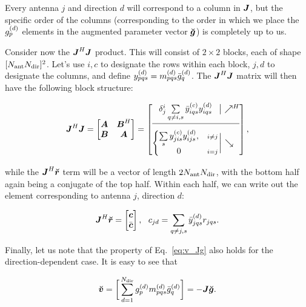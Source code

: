 \documentclass[useAMS,usenatbib]{mn2e}
\newcommand{\mat}[1]{{\bmath{#1}}}
\newcommand{\JJ}{\mat{J}} %
\newcommand{\JHJ}{\JJ^H\JJ} %
\begin{document}
Every antenna $j$ and direction $d$ will correspond to a column in $\JJ$, but the specific order of the columns 
(corresponding to the order in which we place the $g^{(d)}_p$ elements in the augmented parameter vector $\Gg$)
is completely up to us. 

Consider now the $\JHJ$ product. This will consist of $2\times2$ blocks, each of shape 
$[N_\mathrm{ant}N_\mathrm{dir}]^2$. Let's use $i,c$ to designate the rows within each block, $j,d$ to designate the columns, 
and define $y^{(d)}_{pqs}=m^{(d)}_{pqs}\bar{g}^{(d)}_q$. The $\JHJ$ matrix will then have the following block 
structure:

\begin{equation}
\JHJ = \Matrix{cc}{\bmath{A}&\bmath{B}^H\\\bmath{B}&\bmath{A}}
= \JHJblocks{
  \delta^i_j \sum\limits_{q\ne i,s} \yycH_{iqs} \yyd_{iqs} 
}{
  \left \{ 
  \begin{array}{@{}cc@{}}
   \sum\limits_{s} \yyc_{jis} \yyd_{ijs},&{\scriptstyle i\ne j} \\
   0 &{\scriptstyle i=j}
  \end{array} \right . 
},
\label{eq:JHJ:DD:unpol}
\end{equation}

while the $\JJ^H\Rr$ term will be a vector of length $2N_\mathrm{ant}N_\mathrm{dir}$, with the bottom half again being
a conjugate of the top half. Within each half, we can write out the element corresponding to 
antenna $j$, direction $d$: 

\begin{equation}
\label{eq:JHR:DD:unpol}
\JJ^H\Rr = \Matrix{c}{\bmath{c}\\\bar{\bmath{c}}},~~c_{jd} = \sum\limits_{q\ne j,s} 
\yydH_{jqs} r_{jqs}.
\end{equation}

Finally, let us note that the property of Eq.~\ref{eq:v_Jg} also holds for the direction-dependent case. It is easy to see that

\begin{equation}
\label{eq:v_Jg:dd}
\Vv = \bigg [ \sum_{d=1}^{\Nd} \ggd_p \mmd_{pqs} \ggdH_q \bigg ] = -\JJ \Gg.
\end{equation}
\end{document}
